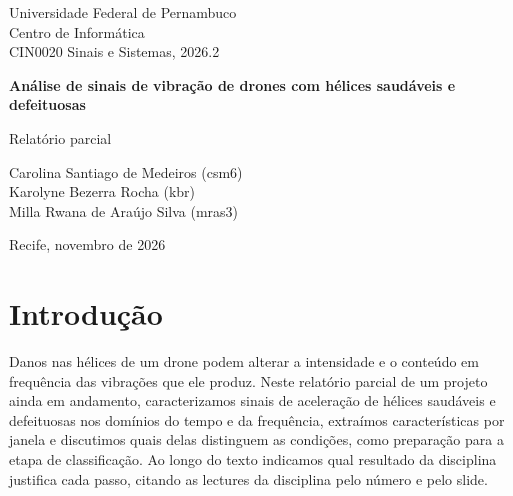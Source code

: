 \documentclass[a4paper]{article}
\begin{document}
\begin{titlepage}
\centering
\vspace*{3cm}
{\large Universidade Federal de Pernambuco\\Centro de Informática\\[4pt]CIN0020 Sinais e Sistemas, 2026.2\par}
\vspace{3cm}
{\LARGE\bfseries Análise de sinais de vibração de drones com hélices saudáveis e defeituosas\par}
\vspace{0.8cm}
{\large Relatório parcial\par}
\vspace{3cm}
{\large Carolina Santiago de Medeiros (csm6)\\Karolyne Bezerra Rocha (kbr)\\Milla Rwana de Araújo Silva (mras3)\par}
\vfill
{\large Recife, novembro de 2026\par}
\end{titlepage}

\begin{abstract}
Analisamos sinais reais de aceleração do conjunto DronePropB para comparar hélices saudáveis e defeituosas. Os registros de um acelerômetro piezoelétrico foram divididos em janelas de 1~s, das quais extraímos características no tempo e na frequência. As medidas de intensidade dependem sobretudo da velocidade e não indicam mais vibração no defeito de forma consistente, enquanto o espectro mostra que a vibração é formada pela rotação e seus harmônicos, que o defeito redistribui a potência entre eles e que a hélice danificada gira um pouco mais devagar.
\end{abstract}

\section{Introdução}

Danos nas hélices de um drone podem alterar a intensidade e o conteúdo em frequência das vibrações que ele produz. Neste relatório parcial de um projeto ainda em andamento, caracterizamos sinais de aceleração de hélices saudáveis e defeituosas nos domínios do tempo e da frequência, extraímos características por janela e discutimos quais delas distinguem as condições, como preparação para a etapa de classificação. Ao longo do texto indicamos qual resultado da disciplina justifica cada passo, citando as lectures da disciplina pelo número e pelo slide.
\end{document}
